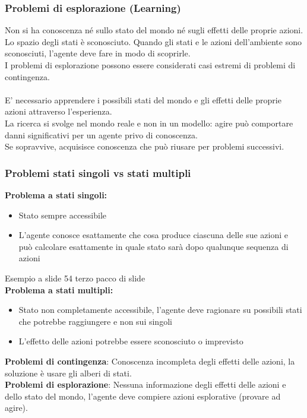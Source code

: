 \documentclass[../main.tex]{subfiles}
\begin{document}
	\subsubsection{Problemi di esplorazione (Learning)} 
	Non si ha conoscenza né sullo stato del mondo né sugli effetti delle proprie azioni. \\
	Lo spazio degli stati è sconosciuto. Quando gli stati e le azioni dell’ambiente sono sconosciuti, l’agente deve fare in modo di scoprirle.\\
	I problemi di esplorazione possono essere considerati casi estremi di problemi di contingenza.\\ \\
	E’ necessario apprendere i possibili stati del mondo e gli effetti delle proprie azioni attraverso l’esperienza.\\
	La ricerca si svolge nel mondo reale e non in un modello: agire può comportare danni significativi per un agente privo di conoscenza. \\
	Se sopravvive, acquisisce conoscenza che può riusare per problemi successivi.
	\subsubsection{Problemi stati singoli vs stati multipli}
	\textbf{Problema a stati singoli:}
	\begin{itemize}
		\item Stato sempre accessibile
		\item L’agente conosce esattamente che cosa produce ciascuna delle sue azioni e può calcolare esattamente in quale stato sarà dopo qualunque sequenza di azioni
	\end{itemize}
	{\color{red} Esempio a slide 54 terzo pacco di slide}\\
	\textbf{Problema a stati multipli:}
	\begin{itemize}
	 	\item Stato non completamente accessibile, l’agente deve ragionare su possibili stati che potrebbe raggiungere e non sui singoli
	 	\item L’effetto delle azioni potrebbe essere sconosciuto o imprevisto
	\end{itemize}
	\textbf{Problemi di contingenza}: Conoscenza incompleta degli effetti delle azioni, la soluzione è usare gli alberi di stati.\\
	\textbf{Problemi di esplorazione}: Nessuna informazione degli effetti delle azioni e dello stato del mondo, l’agente deve compiere azioni esplorative (provare ad agire).
\end{document}
